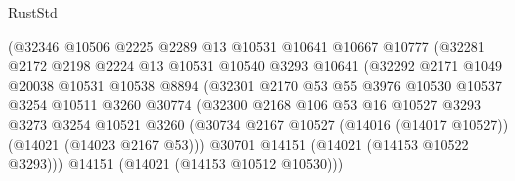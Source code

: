 \begin{lexlean}{RustStd}
\begin{coremodule}
                                (@32346
                                  @10506
                                  @2225
                                  @2289
                                  @13
                                  @10531
                                  @10641
                                  @10667
                                  @10777
                                  (@32281
                                    @2172
                                    @2198
                                    @2224
                                    @13
                                    @10531
                                    @10540
                                    @3293
                                    @10641
                                    (@32292
                                      @2171
                                      @1049
                                      @20038
                                      @10531
                                      @10538
                                      @8894
                                      (@32301
                                        @2170
                                        @53
                                        @55
                                        @3976
                                        @10530
                                        @10537
                                        @3254
                                        @10511
                                        @3260
                                        @30774
                                        (@32300
                                          @2168
                                          @106
                                          @53
                                          @16
                                          @10527
                                          @3293
                                          @3273
                                          @3254
                                          @10521
                                          @3260
                                          (@30734
                                            @2167
                                            @10527
                                            (@14016 (@14017 @10527))
                                            (@14021 (@14023 @2167 @53)))
                                          @30701
                                          @14151
                                          (@14021 (@14153 @10522 @3293)))
                                        @14151
                                        (@14021 (@14153 @10512 @10530)))

\end{coremodule}
\end{lexlean}
